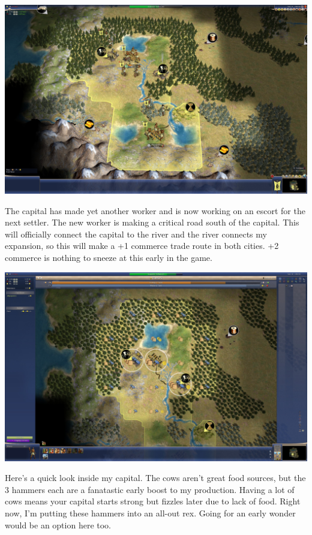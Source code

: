 \documentclass[10pt]{article}
\begin{document}
\includegraphics[width=1.0\textwidth]{14}

The capital has made yet another worker and is now working on an escort for the next settler. The new worker
is making a critical road south of the capital. This will officially connect the capital to the river and
the river connects my expansion, so this will make a +1 commerce trade route in both cities. +2 commerce
is nothing to sneeze at this early in the game.

\includegraphics[width=1.0\textwidth]{15}

Here's a quick look inside my capital. The cows aren't great food sources, but the 3 hammers each are
a fanatastic early boost to my production. Having a lot of cows means your capital starts strong but
fizzles later due to lack of food. Right now, I'm putting these hammers into an all-out rex. Going for
an early wonder would be an option here too.
\end{document}
